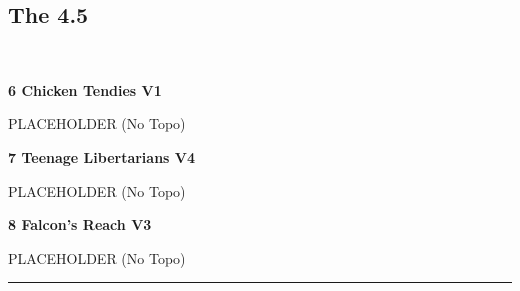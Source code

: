 \begin{multicols}{2}
			\subsection*{The 4.5}\label{bf:The 4.5}
			\begin{minipage}{\columnwidth}
			\
			\end{minipage}
			
					\begin{minipage}{\linewidth}	
					\label{rt:Chicken Tendies}\colorbox{green!20}{\textbf{6 Chicken Tendies V1   }}
					\begin{adjustwidth}{0.5cm}{}				
					PLACEHOLDER
						\newline (No Topo) 
					\end{adjustwidth}
					\end{minipage}
					\begin{minipage}{\linewidth}	
					\label{rt:Teenage Libertarians}\colorbox{RoyalBlue!20}{\textbf{7 Teenage Libertarians V4     }}
					\begin{adjustwidth}{0.5cm}{}				
					PLACEHOLDER
						\newline (No Topo) 
					\end{adjustwidth}
					\end{minipage}
					\begin{minipage}{\linewidth}	
					\label{rt:Falcon's Reach}\colorbox{green!20}{\textbf{8 Falcon's Reach V3   }}
					\begin{adjustwidth}{0.5cm}{}				
					PLACEHOLDER
						\newline (No Topo) 
					\end{adjustwidth}
					\end{minipage}
\end{multicols}
\rule{\textwidth}{1pt}
